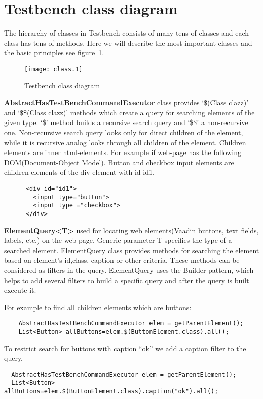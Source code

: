   \section{Testbench class diagram}

  The hierarchy of classes in Testbench consists of many tens of classes and each class has tens of methods.
  Here we will describe the most important classes and the basic principles see
  figure~\ref{fig:classdiagram}.
	\begin{figure}
		\label{fig:classdiagram}
	    \texttt{[image: class.1]}
	    \caption{Testbench class diagram}
    \end{figure}
    
\textbf{AbstractHasTestBenchCommandExecutor} class provides  `\$(Class clazz)'
and `\$\$(Class clazz)' methods which create a query for searching elements of
the given type.
 `\$' method builds a recursive search query and `\$\$' a non-recursive one.
 Non-recursive search query looks only for direct children of the element, while
 it is recursive analog looks through all children of the element. Children
 elements are inner html-elements.
   For example if web-page has the following DOM(Document-Object Model). 
   Button and checkbox input elements are children elements of the div element with id id1.
  \lstset{language=HTML}
    \begin{lstlisting}
      <div id="id1">
        <input type="button">
        <input type ="checkbox">
      </div>
  \end{lstlisting}
  
  
\textbf{ElementQuery<T>} used for locating web elements(Vaadin buttons, text
fields, labels, etc.) on the web-page.
 Generic parameter T specifies the type of a searched element. 
 ElementQuery class provides methods for searching the element based on
 element's id,class, caption or other criteria. These methods can be considered as filters in the query.
 ElementQuery uses the Builder pattern, which helps to add several filters to build a specific query and after
 the query is built execute it.

For example to find all children elements which are buttons:
  \lstset{language=Java}
    \begin{lstlisting}
    AbstractHasTestBenchCommandExecutor elem = getParentElement();
    List<Button> allButtons=elem.$(ButtonElement.class).all();
  \end{lstlisting}
  
To restrict search for buttons with caption ``ok'' we add a caption filter to the query.
  \lstset{style=a1listing}
  \begin{lstlisting}
  AbstractHasTestBenchCommandExecutor elem = getParentElement();
  List<Button> allButtons=elem.$(ButtonElement.class).caption("ok").all();
  \end{lstlisting}
  
